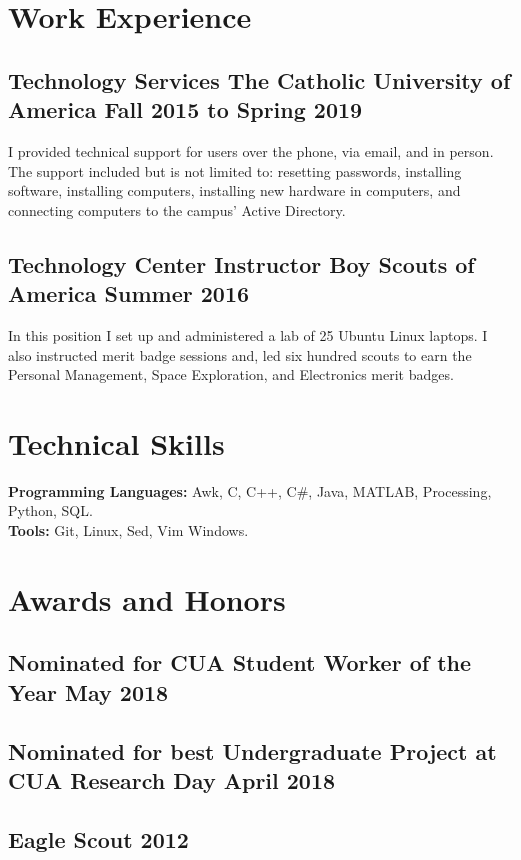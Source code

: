 \documentclass[12pt, letterpaper]{article}
\begin{document}
\section{Work Experience}
\subsection{Technology Services \hspace {60pt}The Catholic University of America \hfill Fall 2015 to Spring 2019}
\justify
I provided technical support for users over the phone, via email, and in person.
The support included but is not limited to:
resetting passwords,
installing software,
installing computers,
installing new hardware in computers,
and
connecting computers to the campus' Active Directory.
\subsection{Technology Center Instructor \hspace {45pt} Boy Scouts of America \hfill Summer 2016}
\justify
In this position I set up and administered a lab of 25 Ubuntu Linux laptops.
I also instructed merit badge sessions and, led six hundred scouts to earn the
Personal Management,
Space Exploration,
and
Electronics
merit badges.

\section{Technical Skills}
\textbf{Programming Languages:}
Awk,
C,
C++,
C\#,
Java,
MATLAB,
Processing,
Python,
SQL.\\
\textbf{Tools:}
Git,
Linux,
Sed,
Vim
Windows.

\section{Awards and Honors}
\subsection{Nominated for CUA Student Worker of the Year \hfill May 2018}
\subsection{Nominated for best Undergraduate Project at CUA Research Day \hfill April 2018}
\subsection{Eagle Scout \hfill 2012}
\end{document}

